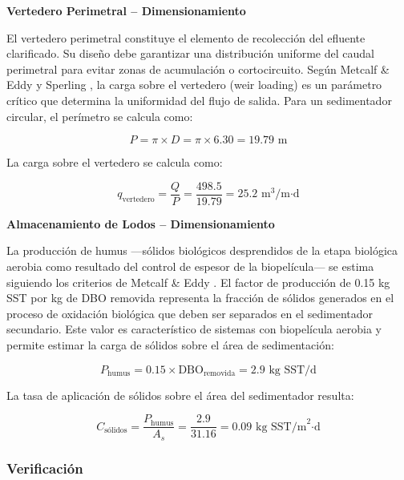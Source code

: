 \documentclass[12pt,a4paper]{article}
\begin{document}
\textbf{Vertedero Perimetral -- Dimensionamiento}

El vertedero perimetral constituye el elemento de recolección del efluente clarificado. Su diseño debe garantizar una distribución uniforme del caudal perimetral para evitar zonas de acumulación o cortocircuito. Según Metcalf \& Eddy \cite{metcalf2014} y Sperling \cite{sperling2007}, la carga sobre el vertedero (weir loading) es un parámetro crítico que determina la uniformidad del flujo de salida. Para un sedimentador circular, el perímetro se calcula como:

\begin{equation}
P = \pi \times D = \pi \times 6.30 = 19.79 \text{ m}
\end{equation}

La carga sobre el vertedero se calcula como:

\begin{equation}
q_{\text{vertedero}} = \frac{Q}{P} = \frac{498.5}{19.79} = 25.2 \text{ m}^3\text{/m·d}
\end{equation}

\textbf{Almacenamiento de Lodos -- Dimensionamiento}

La producción de humus —sólidos biológicos desprendidos de la etapa biológica aerobia como resultado del control de espesor de la biopelícula— se estima siguiendo los criterios de Metcalf \& Eddy \cite{metcalf2014}. El factor de producción de 0.15 kg SST por kg de DBO removida representa la fracción de sólidos generados en el proceso de oxidación biológica que deben ser separados en el sedimentador secundario. Este valor es característico de sistemas con biopelícula aerobia y permite estimar la carga de sólidos sobre el área de sedimentación:

\begin{equation}
P_{\text{humus}} = 0.15 \times \text{DBO}_{\text{removida}} = 2.9 \text{ kg SST/d}
\end{equation}

La tasa de aplicación de sólidos sobre el área del sedimentador resulta:

\begin{equation}
C_{\text{sólidos}} = \frac{P_{\text{humus}}}{A_s} = \frac{2.9}{31.16} = 0.09 \text{ kg SST/m}^2\text{·d}
\end{equation}

\subsubsection{Verificación}
\end{document}
